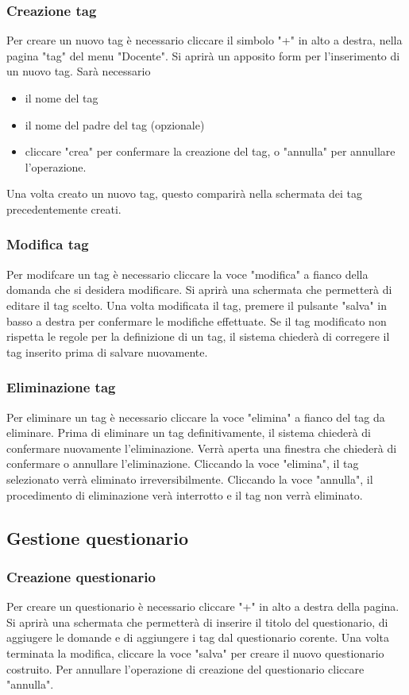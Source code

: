 \documentclass[12pt,a4paper]{article}
\begin{document}
		\subsubsection{Creazione tag}
		Per creare un nuovo tag è necessario cliccare il simbolo "+" in alto a destra, nella pagina "tag" del menu "Docente".
		Si aprirà un apposito form per l'inserimento di un nuovo tag.
		Sarà necessario 
			\begin{itemize}
			\item il nome del tag
			\item il nome del padre del tag (opzionale)
			\item cliccare "crea" per confermare la creazione del tag, o "annulla" per annullare l'operazione.
		\end{itemize}
		
		Una volta creato un nuovo tag, questo comparirà nella schermata dei tag precedentemente creati.
		
		\subsubsection{Modifica tag}
		Per modifcare un tag è necessario cliccare la voce "modifica" a fianco della domanda che si desidera modificare. Si aprirà una schermata che permetterà di editare il tag scelto.
		Una volta modificata il tag, premere il pulsante "salva" in basso a destra per confermare le modifiche effettuate. 
		Se il tag modificato non rispetta le regole per la definizione di un tag, il sistema chiederà di corregere il tag inserito prima di salvare nuovamente.
		\subsubsection{Eliminazione tag}
			Per eliminare un tag è necessario cliccare la voce "elimina" a fianco del tag da eliminare. Prima di eliminare un tag definitivamente, il sistema chiederà di confermare nuovamente l'eliminazione.
			Verrà aperta una finestra che chiederà di confermare o annullare l'eliminazione. Cliccando la voce "elimina", il tag selezionato verrà eliminato irreversibilmente. Cliccando la voce "annulla", il procedimento di eliminazione verà interrotto e il tag non verrà eliminato.
	\subsection{Gestione questionario}
		\subsubsection{Creazione questionario}
			Per creare un questionario è necessario cliccare "+" in alto a destra della pagina. Si aprirà una schermata che permetterà di inserire il titolo del questionario, di aggiugere le domande e di aggiungere i tag dal questionario corente.
			Una volta terminata la modifica, cliccare la voce "salva" per creare il nuovo questionario costruito. 
			Per annullare l'operazione di creazione del questionario cliccare "annulla".
			
\end{document}
